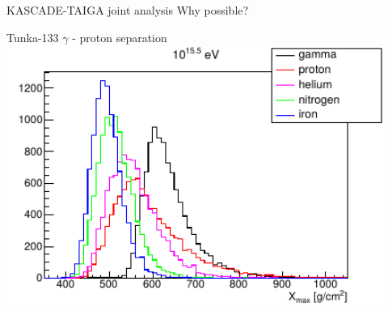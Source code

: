 
%

\begin{frame}{KASCADE-TAIGA joint analysis}
 Why possible?
\end{frame}

\begin{frame}{Tunka-133 $\gamma$ - proton separation}
  \centering\includegraphics[width=0.93\textwidth]{pics/tunka_gamma_cr_diff.pdf}
\end{frame}

